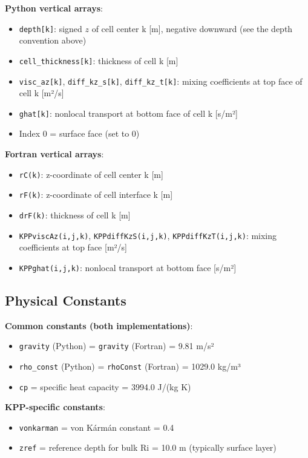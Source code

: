 \documentclass[11pt]{article}
\begin{document}
\textbf{Python vertical arrays}:
\begin{itemize}
    \item \verb|depth[k]|: signed $z$ of cell center k [m], negative downward (see the depth convention above)
    \item \verb|cell_thickness[k]|: thickness of cell k [m]
    \item \verb|visc_az[k]|, \verb|diff_kz_s[k]|, \verb|diff_kz_t[k]|: mixing coefficients at top face of cell k [m²/s]
    \item \verb|ghat[k]|: nonlocal transport at bottom face of cell k [s/m²]
    \item Index 0 = surface face (set to 0)
\end{itemize}

\textbf{Fortran vertical arrays}:
\begin{itemize}
    \item \verb|rC(k)|: z-coordinate of cell center k [m]
    \item \verb|rF(k)|: z-coordinate of cell interface k [m]
    \item \verb|drF(k)|: thickness of cell k [m]
    \item \verb|KPPviscAz(i,j,k)|, \verb|KPPdiffKzS(i,j,k)|, \verb|KPPdiffKzT(i,j,k)|: mixing coefficients at top face [m²/s]
    \item \verb|KPPghat(i,j,k)|: nonlocal transport at bottom face [s/m²]
\end{itemize}

\subsection{Physical Constants}

\textbf{Common constants (both implementations)}:
\begin{itemize}
    \item \verb|gravity| (Python) = \verb|gravity| (Fortran) = 9.81 m/s²
    \item \verb|rho_const| (Python) = \verb|rhoConst| (Fortran) = 1029.0 kg/m³
    \item \verb|cp| = specific heat capacity = 3994.0 J/(kg K)
\end{itemize}

\textbf{KPP-specific constants}:
\begin{itemize}
    \item \verb|vonkarman| = von Kármán constant = 0.4
    \item \verb|zref| = reference depth for bulk Ri = 10.0 m (typically surface layer)
\end{itemize}
\end{document}
